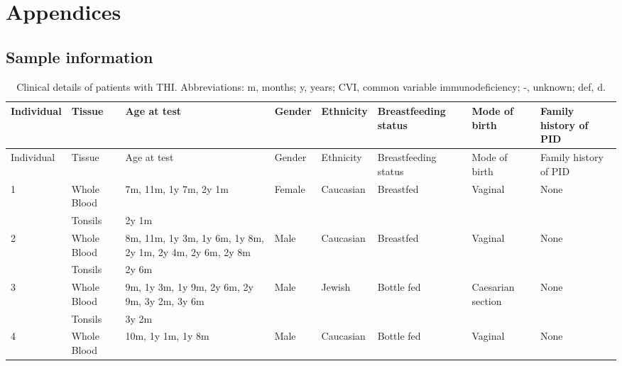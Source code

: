 \documentclass[12pt]{article}
\begin{document}
\appendix
	\section{Appendices}
		
		\subsection{Sample information}

			
			
			
			
			\begin{landscape} %
				\footnotesize
				\begin{longtable}[c]{|l | l |p{4cm}|l|l|l|l|l|}
					\caption{Clinical details of patients with THI. Abbreviations: m, months; y, years; CVI, common variable immunodeficiency; -, unknown; def, d.} \\ \hline 	
					Individual & Tissue & Age at test  & Gender  & Ethnicity   & Breastfeeding status & Mode of birth & Family history of PID    \\ \hline \hline
					\endfirsthead
					\hline
					Individual & Tissue & Age at test  & Gender  & Ethnicity   & Breastfeeding status & Mode of birth & Family history of PID    \\ \hline \hline
					\endhead
					\hline 	\endfoot 
					\label{table:samples}
					1  & Whole Blood & 7m, 11m, 1y 7m, 2y 1m                                    & Female & Caucasian & Breastfed  & Vaginal           & None                 \\
					   & Tonsils     & 2y 1m                                                    &        &           &            &                   &  \\ \hline
					2  & Whole Blood & 8m, 11m, 1y 3m, 1y 6m, 1y 8m, 2y 1m, 2y 4m, 2y 6m, 2y 8m & Male   & Caucasian & Breastfed  & Vaginal           & None                 \\
					   & Tonsils     & 2y 6m                                                    &        &           &            &                   &  \\ \hline
					3  & Whole Blood & 9m, 1y 3m, 1y 9m, 2y 6m, 2y 9m, 3y 2m, 3y 6m             & Male   & Jewish    & Bottle fed & Caesarian section & None                 \\
					   & Tonsils     & 3y 2m                                                    &        &           &            &                   &  \\ \hline
					4  & Whole Blood & 10m, 1y 1m, 1y 8m                                        & Male   & Caucasian & Bottle fed & Vaginal           & None                 \\ \hline

\end{longtable}
\end{landscape}
\end{document}

